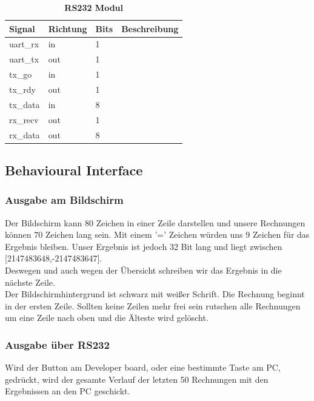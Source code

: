 
\begin{table}[!h]
 \caption{\textbf{RS232 Modul}}
 \begin{center}
  \begin{tabular}{|p{4cm}|p{}|p{1cm}|p{9cm}|}
   \hline Signal & Richtung & Bits & Beschreibung\\
   \hline
   uart\_rx & in & 1 & \\
   uart\_tx & out & 1 & \\
   tx\_go & in & 1 & \\
   tx\_rdy & out & 1 & \\
   tx\_data & in & 8 & \\
   rx\_recv & out & 1 & \\
   rx\_data & out & 8 & \\
   \hline
  \end{tabular}
 \end{center}
\end{table}

\subsection{Behavioural Interface}
\subsubsection{Ausgabe am Bildschirm}
Der Bildschirm kann 80 Zeichen in einer Zeile darstellen und unsere Rechnungen können 70 Zeichen lang sein. Mit einem '=' 
Zeichen würden uns 9 Zeichen für das Ergebnis bleiben. Unser Ergebnis ist jedoch 32 Bit lang und liegt zwischen [2147483648,-2147483647].\\
Deswegen und auch wegen der Übersicht schreiben wir das Ergebnis in die nächste Zeile.\\
Der Bildschirmhintergrund ist schwarz mit weißer Schrift. Die Rechnung beginnt in der ersten Zeile. Sollten keine Zeilen mehr 
frei sein rutschen alle Rechnungen um eine Zeile nach oben und die Älteste wird gelöscht.
\subsubsection{Ausgabe über RS232}
Wird der Button am Developer board, oder eine bestimmte Taste am PC, gedrückt, wird der gesamte Verlauf der letzten 50 Rechnungen mit den Ergebnissen an den PC geschickt.
